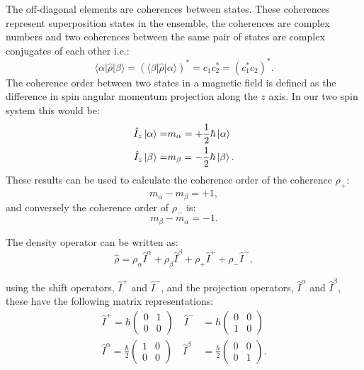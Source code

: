 The off-diagonal elements are coherences between states. These coherences represent superposition states in the ensemble,
the coherences are complex numbers and two coherences between the same pair of states are complex conjugates of each other i.e.:
\begin{equation}
  \langle\alpha\vert\hat\rho\vert\beta\rangle = (\langle\beta\vert\hat\rho\vert\alpha\rangle)^* = c_1c_2^* = (c_1^*c_2)^*.
\end{equation}
The coherence order between two states in a magnetic field is defined as the difference in spin angular
momentum projection along the $z$ axis. In our two spin system this would be:
\begin{align}
  \hat{I}_z\ket{\alpha} =& m_\alpha = +\frac{1}{2}\hbar\ket{\alpha}\\
  \hat{I}_z\ket{\beta} =& m_\beta = -\frac{1}{2}\hbar\ket{\beta}.
\end{align}
These results can be used to calculate the coherence order of the coherence $\rho_+$:
\begin{equation}
 m_\alpha - m_\beta = +1,
\end{equation}
and conversely the coherence order of $\rho_-$ is:
\begin{equation}
  m_\beta - m_\alpha = -1.
\end{equation}

The density operator can be written as:
\begin{equation}
  \hat{\rho} = \rho_\alpha\hat{I}^\alpha + \rho_\beta\hat{I}^\beta + \rho_+\hat{I}^+ + \rho_-\hat{I}^-,
\end{equation}

using the shift operators, $\hat{I}^+$ and $\hat{I}^-$, and the projection operators, $\hat{I}^\alpha$ and $\hat{I}^\beta$, these have the following matrix representations:
\begin{align*}
  \hat{I}^+ = \hbar\begin{pmatrix}
    0 & 1\\
    0 & 0
\end{pmatrix}\quad\hat{I}^- &= \hbar\begin{pmatrix}
  0 & 0\\
  1 & 0
\end{pmatrix}\\
\hat{I}^\alpha = \frac{\hbar}{2}\begin{pmatrix}
  1 & 0\\
  0 & 0
\end{pmatrix}\quad\hat{I}^\beta &= \frac{\hbar}{2}\begin{pmatrix}
  0 & 0\\
  0 & 1
\end{pmatrix}.
\end{align*}

